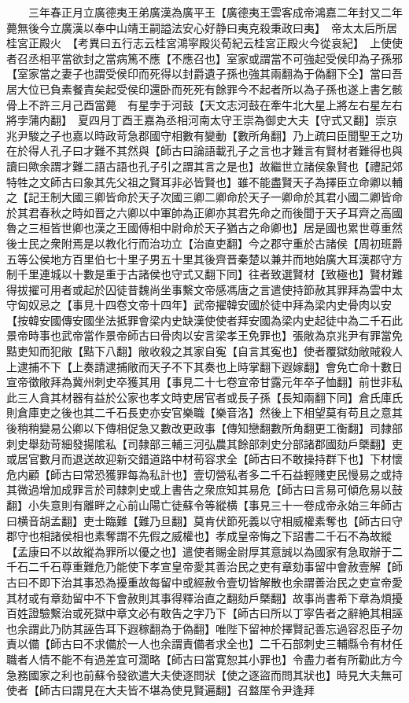 　　三年春正月立廣德夷王弟廣漢為廣平王【廣德夷王雲客成帝鴻嘉二年封又二年薨無後今立廣漢以奉中山靖王嗣謚法安心好静曰夷克殺秉政曰夷】　帝太太后所居桂宮正殿火　【考異曰五行志云桂宮鴻寜殿災荀紀云桂宮正殿火今從哀紀】　上使使者召丞相平當欲封之當病篤不應【不應召也】室家或謂當不可強起受侯印為子孫邪【室家當之妻子也謂受侯印而死得以封爵遺子孫也強其兩翻為于偽翻下仝】當曰吾居大位已負素餐責矣起受侯印還卧而死死有餘罪今不起者所以為子孫也遂上書乞骸骨上不許三月己酉當薨　有星孛于河鼓【天文志河鼓在牽牛北大星上將左右星左右將孛蒲内翻】　夏四月丁酉王嘉為丞相河南太守王崇為御史大夫【守式又翻】崇京兆尹駿之子也嘉以時政苛急郡國守相數有變動【數所角翻】乃上疏曰臣聞聖王之功在於得人孔子曰才難不其然與【師古曰論語載孔子之言也才難言有賢材者難得也與讀曰歟余謂才難二語古語也孔子引之謂其言之是也】故繼世立諸侯象賢也【禮記郊特牲之文師古曰象其先父祖之賢耳非必皆賢也】雖不能盡賢天子為擇臣立命卿以輔之【記王制大國三卿皆命於天子次國三卿二卿命於天子一卿命於其君小國二卿皆命於其君春秋之時如晋之六卿以中軍帥為正卿亦其君先命之而後聞于天子耳齊之高國魯之三桓皆世卿也漢之王國傅相中尉命於天子猶古之命卿也】居是國也累世尊重然後士民之衆附焉是以教化行而治功立【治直吏翻】今之郡守重於古諸侯【周初班爵五等公侯地方百里伯七十里子男五十里其後齊晋秦楚以兼并而地始廣大耳漢郡守方制千里連城以十數是重于古諸侯也守式又翻下同】往者致選賢材【致極也】賢材難得拔擢可用者或起於囚徒昔魏尚坐事繫文帝感馮唐之言遣使持節赦其罪拜為雲中太守匈奴忌之【事見十四卷文帝十四年】武帝擢韓安國於徒中拜為梁内史骨肉以安【按韓安國傳安國坐法抵罪會梁内史缺漢使使者拜安國為梁内史起徒中為二千石此景帝時事也武帝當作景帝師古曰骨肉以安言梁孝王免罪也】張敞為京兆尹有罪當免黠吏知而犯敞【黠下八翻】敞收殺之其家自寃【自言其寃也】使者覆獄劾敞賊殺人上逮捕不下【上奏請逮捕敞而天子不下其奏也上時掌翻下遐嫁翻】會免亡命十數日宣帝徵敞拜為冀州刺史卒獲其用【事見二十七卷宣帝甘露元年卒子恤翻】前世非私此三人貪其材器有益於公家也孝文時吏居官者或長子孫【長知兩翻下同】倉氏庫氏則倉庫吏之後也其二千石長吏亦安官樂職【樂音洛】然後上下相望莫有苟且之意其後稍稍變易公卿以下傳相促急又數改更政事【傳知戀翻數所角翻更工衡翻】司隸部刺史舉劾苛細發揚隂私【司隸部三輔三河弘農其餘部刺史分部諸郡國劾戶槩翻】吏或居官數月而退送故迎新交錯道路中材苟容求全【師古曰不敢操持群下也】下材懷危内顧【師古曰常恐獲罪每為私計也】壹切營私者多二千石益輕賤吏民慢易之或持其微過增加成罪言於司隸刺史或上書告之衆庶知其易危【師古曰言易可傾危易以鼓翻】小失意則有離畔之心前山陽亡徒蘇令等縱横【事見三十一卷成帝永始三年師古曰横音胡孟翻】吏士臨難【難乃旦翻】莫肯伏節死義以守相威權素奪也【師古曰守郡守也相諸侯相也素奪謂不先假之威權也】孝成皇帝悔之下詔書二千石不為故縱【孟康曰不以故縱為罪所以優之也】遣使者賜金尉厚其意誠以為國家有急取辦于二千石二千石尊重難危乃能使下孝宣皇帝愛其善治民之吏有章劾事留中會赦壹解【師古曰不即下治其事恐為擾重故每留中或經赦令壹切皆解散也余謂善治民之吏宣帝愛其材或有章劾留中不下會赦則其事得釋治直之翻劾戶槩翻】故事尚書希下章為煩擾百姓證驗繫治或死獄中章文必有敢告之字乃下【師古曰所以丁寜告者之辭絶其相誣也余謂此乃防其誣告耳下遐稼翻為于偽翻】唯陛下留神於擇賢記善忘過容忍臣子勿責以備【師古曰不求備於一人也余謂責備者求全也】二千石部刺史三輔縣令有材任職者人情不能不有過差宜可濶略【師古曰當寛恕其小罪也】令盡力者有所勸此方今急務國家之利也前蘇令發欲遣大夫使逐問狀【使之逐盜而問其狀也】時見大夫無可使者【師古曰謂見在大夫皆不堪為使見賢遍翻】召盩厔令尹逢拜